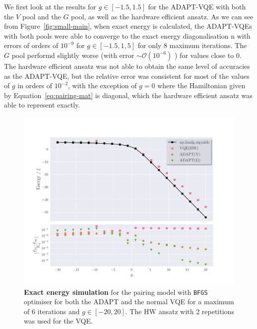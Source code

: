 We first look at the results for $ g \in [-1.5, 1.5] $ for the ADAPT-VQE with both the $ V $ pool and the $ G $ pool, as well as the hardware efficient ansatz. As we can see from Figure~\ref{fig:small-main}, when exact energy is calculated, the ADAPT-VQEs with both pools were able to converge to the exact energy diagonalisation n with errors of orders of $ 10^{-9} $ for $ g \in [-1.5, 1,5] $ for only $ 8 $ maximum iterations. The $G$ pool performd slightly worse (with error $ \sim \mathcal{O}(10^{-6}) $ ) for values close to $ 0 $. The hardware efficient ansatz was not able to obtain the same level of accuracies as the ADAPT-VQE, but the relative error was consistent for most of the values of $ g $ in orders of $ 10^{-2} $, with the exception of $ g = 0$ where the Hamiltonian given by Equation~\eqref{eq:pairing-mat} is diagonal, which the hardware efficient ansatz was able to represent exactly.

\begin{figure}[ht]
    \centering
    \includegraphics[width=\linewidth]{image/pairing_result/no_shot_noise/sameparams-big.pdf}
    \caption{\textbf{Exact energy simulation} for the pairing model with \texttt{BFGS} optimiser for both the ADAPT and the normal VQE for a maximum of $ 6 $ iterations and $ g \in[-20,20] $. The HW ansatz with 2 repetitions was used for the VQE.}
    \label{fig:big-main}
\end{figure}


